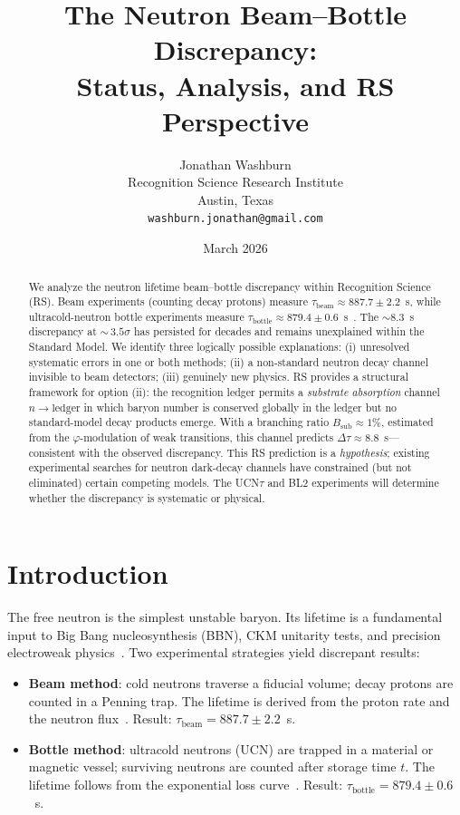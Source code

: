\documentclass[12pt,a4paper]{article}
\title{The Neutron Beam--Bottle Discrepancy:\\
Status, Analysis, and RS Perspective}
\author{Jonathan Washburn\\
Recognition Science Research Institute\\
Austin, Texas\\
\texttt{washburn.jonathan@gmail.com}}
\date{March 2026}
\theoremstyle{definition}
\theoremstyle{remark}
\begin{document}
\maketitle

\begin{abstract}
We analyze the neutron lifetime beam--bottle discrepancy within
Recognition Science (RS).  Beam experiments (counting decay protons)
measure $\tau_{\mathrm{beam}} \approx 887.7 \pm 2.2$~s, while
ultracold-neutron bottle experiments measure
$\tau_{\mathrm{bottle}} \approx 879.4 \pm 0.6$~s~\cite{PDG}.  The
$\sim 8.3$~s discrepancy at ${\sim}\,3.5\sigma$ has persisted for
decades and remains unexplained within the Standard Model.  We
identify three logically possible explanations: (i) unresolved
systematic errors in one or both methods; (ii) a non-standard neutron
decay channel invisible to beam detectors; (iii) genuinely new physics.
RS provides a structural framework for option (ii): the recognition
ledger permits a \emph{substrate absorption} channel $n \to
\mathrm{ledger}$ in which baryon number is conserved globally in
the ledger but no standard-model decay products emerge.  With a
branching ratio $B_{\mathrm{sub}} \approx 1\%$, estimated from the
$\varphi$-modulation of weak transitions, this channel predicts
$\Delta\tau \approx 8.8$~s---consistent with the observed discrepancy.
This RS prediction is a \emph{hypothesis}; existing experimental
searches for neutron dark-decay channels have constrained (but not
eliminated) certain competing models.  The UCN$\tau$ and BL2 experiments
will determine whether the discrepancy is systematic or physical.
\end{abstract}

\section{Introduction}
\label{sec:intro}

The free neutron is the simplest unstable baryon.  Its lifetime is a
fundamental input to Big Bang nucleosynthesis (BBN), CKM unitarity
tests, and precision electroweak physics~\cite{RS_Axioms}.  Two
experimental strategies yield discrepant results:

\begin{itemize}[nosep]
  \item \textbf{Beam method}: cold neutrons traverse a fiducial volume;
  decay protons are counted in a Penning trap.  The lifetime is derived
  from the proton rate and the neutron flux~\cite{Yue2013}.
  Result: $\tau_{\mathrm{beam}} = 887.7 \pm 2.2$~s.
  \item \textbf{Bottle method}: ultracold neutrons (UCN) are trapped in
  a material or magnetic vessel; surviving neutrons are counted after
  storage time $t$.  The lifetime follows from the exponential loss
  curve~\cite{PDG}.
  Result: $\tau_{\mathrm{bottle}} = 879.4 \pm 0.6$~s.
\end{itemize}
\end{document}
